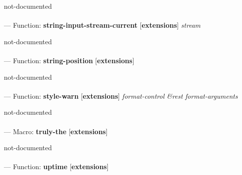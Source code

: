 \begin{adjustwidth}{5em}{5em}
not-documented
\end{adjustwidth}

\paragraph{}
\label{EXTENSIONS:STRING-INPUT-STREAM-CURRENT}
--- Function: \textbf{string-input-stream-current} [\textbf{extensions}] \textit{stream}

\begin{adjustwidth}{5em}{5em}
not-documented
\end{adjustwidth}

\paragraph{}
\label{EXTENSIONS:STRING-POSITION}
--- Function: \textbf{string-position} [\textbf{extensions}] \textit{}

\begin{adjustwidth}{5em}{5em}
not-documented
\end{adjustwidth}

\paragraph{}
\label{EXTENSIONS:STYLE-WARN}
--- Function: \textbf{style-warn} [\textbf{extensions}] \textit{format-control \&rest format-arguments}

\begin{adjustwidth}{5em}{5em}
not-documented
\end{adjustwidth}

\paragraph{}
\label{EXTENSIONS:TRULY-THE}
--- Macro: \textbf{truly-the} [\textbf{extensions}] \textit{}

\begin{adjustwidth}{5em}{5em}
not-documented
\end{adjustwidth}

\paragraph{}
\label{EXTENSIONS:UPTIME}
--- Function: \textbf{uptime} [\textbf{extensions}] \textit{}

